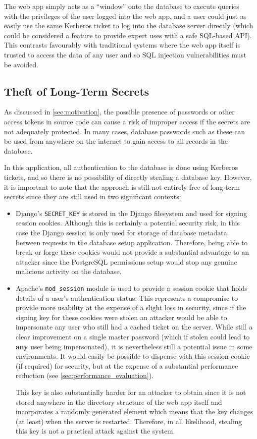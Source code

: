 \documentclass[12pt]{report}
\begin{document}
The web app simply acts as a ``window'' onto the database to execute queries with the privileges of the user logged into the web app, and a user could just as easily use the same Kerberos ticket to log into the database server directly (which could be considered a feature to provide expert uses with a safe SQL-based API). This contrasts favourably with traditional systems where the web app itself is trusted to access the data of any user and so SQL injection vulnerabilities must be avoided.

\subsection{Theft of Long-Term Secrets}
As discussed in \autoref{sec:motivation}, the possible presence of passwords or other access tokens in source code can cause a risk of improper access if the secrets are not adequately protected. In many cases, database passwords such as these can be used from anywhere on the internet to gain access to all records in the database.

In this application, all authentication to the database is done using Kerberos tickets, and so there is no possibility of directly stealing a database key. However, it is important to note that the approach is still not entirely free of long-term secrets since they are still used in two significant contexts:
\begin{itemize}
\item
  Django's \verb+SECRET_KEY+ is stored in the Django filesystem and used for signing session cookies. Although this is certainly a potential security risk, in this case the Django session is only used for storage of database metadata between requests in the database setup application. Therefore, being able to break or forge these cookies would not provide a substantial advantage to an attacker since the PostgreSQL permissions setup would stop any genuine malicious activity on the database.
\item
  Apache's \verb+mod_session+ module is used to provide a session cookie that holds details of a user's authentication status. This represents a compromise to provide more usability at the expense of a slight loss in security, since if the signing key for these cookies were stolen an attacker would be able to impersonate any user who still had a cached ticket on the server. While still a clear improvement on a single master password (which if stolen could lead to \textbf{any} user being impersonated), it is nevertheless still a potential issue in some environments. It would easily be possible to dispense with this session cookie (if required) for security, but at the expense of a substantial performance reduction (see \autoref{sec:performance_evaluation}).

  This key is also substantially harder for an attacker to obtain since it is not stored anywhere in the directory structure of the web app itself and incorporates a randomly generated element which means that the key changes (at least) when the server is restarted. Therefore, in all likelihood, stealing this key is not a practical attack against the system.
\end{itemize}
\end{document}
